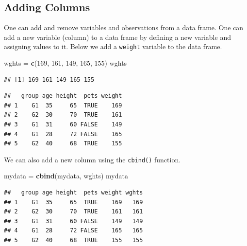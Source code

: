 \documentclass[
]{book}
\newenvironment{Shaded}{\begin{snugshade}}{\end{snugshade}}
\newcommand{\DecValTok}[1]{\textcolor[rgb]{0.00,0.00,0.81}{#1}}
\newcommand{\KeywordTok}[1]{\textcolor[rgb]{0.13,0.29,0.53}{\textbf{#1}}}
\newcommand{\NormalTok}[1]{#1}
\newcommand{\OperatorTok}[1]{\textcolor[rgb]{0.81,0.36,0.00}{\textbf{#1}}}
\newcommand{\StringTok}[1]{\textcolor[rgb]{0.31,0.60,0.02}{#1}}
\begin{document}
\hypertarget{adding-columns}{%
\subsection*{Adding Columns}\label{adding-columns}}

One can add and remove variables and observations from a data frame. One can add a new variable (column) to a data frame by defining a new variable and assigning values to it. Below we add a \texttt{weight} variable to the data frame.

\begin{Shaded}
\begin{Highlighting}[]
\NormalTok{wghts =}\StringTok{ }\KeywordTok{c}\NormalTok{(}\DecValTok{169}\NormalTok{, }\DecValTok{161}\NormalTok{, }\DecValTok{149}\NormalTok{, }\DecValTok{165}\NormalTok{, }\DecValTok{155}\NormalTok{)}
\NormalTok{wghts}
\end{Highlighting}
\end{Shaded}

\begin{verbatim}
## [1] 169 161 149 165 155
\end{verbatim}

\begin{Shaded}
\end{Shaded}

\begin{verbatim}
##   group age height  pets weight
## 1    G1  35     65  TRUE    169
## 2    G2  30     70  TRUE    161
## 3    G1  31     60 FALSE    149
## 4    G1  28     72 FALSE    165
## 5    G2  40     68  TRUE    155
\end{verbatim}

We can also add a new column using the \texttt{cbind()} function.

\begin{Shaded}
\begin{Highlighting}[]
\NormalTok{mydata =}\StringTok{ }\KeywordTok{cbind}\NormalTok{(mydata, wghts)}
\NormalTok{mydata}
\end{Highlighting}
\end{Shaded}

\begin{verbatim}
##   group age height  pets weight wghts
## 1    G1  35     65  TRUE    169   169
## 2    G2  30     70  TRUE    161   161
## 3    G1  31     60 FALSE    149   149
## 4    G1  28     72 FALSE    165   165
## 5    G2  40     68  TRUE    155   155
\end{verbatim}
\end{document}
